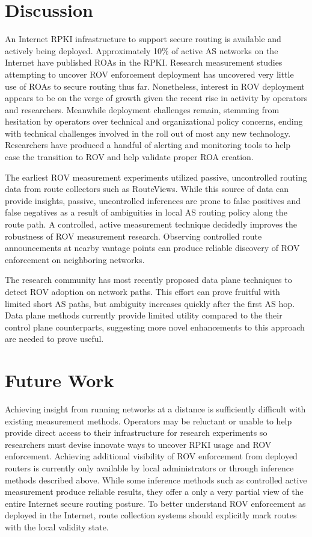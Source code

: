 \documentclass[sigconf]{acmart}
\begin{document}
\section{Discussion}\label{sec:Discussion}

An Internet RPKI infrastructure to support secure routing is available
and actively being deployed.  Approximately 10\% of active AS networks
on the Internet have published ROAs in the RPKI.   Research measurement
studies attempting to uncover ROV enforcement deployment has uncovered
very little use of ROAs to secure routing thus far.  Nonetheless,
interest in ROV deployment appears to be on the verge of growth given
the recent rise in activity by operators and researchers.  Meanwhile
deployment challenges remain, stemming from hesitation by operators over
technical and organizational policy concerns, ending with technical
challenges involved in the roll out of most any new technology.
Researchers have produced a handful of alerting and monitoring tools to
help ease the transition to ROV and help validate proper ROA creation.

The earliest ROV measurement experiments utilized passive, uncontrolled
routing data from route collectors such as RouteViews.  While this
source of data can provide insights, passive, uncontrolled inferences
are prone to false positives and false negatives as a result of
ambiguities in local AS routing policy along the route path.  A
controlled, active measurement technique decidedly improves the
robustness of ROV measurement research.  Observing controlled route
announcements at nearby vantage points can produce reliable discovery of
ROV enforcement on neighboring networks.

The research community has most recently proposed data plane techniques
to detect ROV adoption on network paths.  This effort can prove fruitful
with limited short AS paths, but ambiguity increases quickly after the
first AS hop.  Data plane methods currently provide limited utility
compared to the their control plane counterparts, suggesting more novel
enhancements to this approach are needed to prove useful.

\section{Future Work}\label{sec:Future Work}

Achieving insight from running networks at a distance is sufficiently
difficult with existing measurement methods.  Operators may be reluctant
or unable to help provide direct access to their infrastructure for
research experiments so researchers must devise innovate ways to uncover
RPKI usage and ROV enforcement.  Achieving additional visibility of ROV
enforcement from deployed routers is currently only available by local
administrators or through inference methods described above.  While some
inference methods such as controlled active measurement produce reliable
results, they offer a only a very partial view of the entire Internet
secure routing posture.  To better understand ROV enforcement as
deployed in the Internet, route collection systems should explicitly
mark routes with the local validity state.
\end{document}
